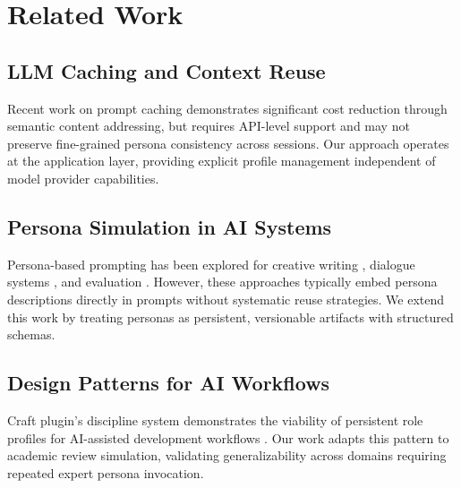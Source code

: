 \section{Related Work}

\subsection{LLM Caching and Context Reuse}

Recent work on prompt caching \cite{anthropic2024caching} demonstrates significant cost reduction through semantic content addressing, but requires API-level support and may not preserve fine-grained persona consistency across sessions. Our approach operates at the application layer, providing explicit profile management independent of model provider capabilities.

\subsection{Persona Simulation in AI Systems}

Persona-based prompting has been explored for creative writing \cite{dang2023personas}, dialogue systems \cite{zhang2018personas}, and evaluation \cite{park2023generative}. However, these approaches typically embed persona descriptions directly in prompts without systematic reuse strategies. We extend this work by treating personas as persistent, versionable artifacts with structured schemas.

\subsection{Design Patterns for AI Workflows}

Craft plugin's discipline system demonstrates the viability of persistent role profiles for AI-assisted development workflows \cite{internal2025craft}. Our work adapts this pattern to academic review simulation, validating generalizability across domains requiring repeated expert persona invocation.
